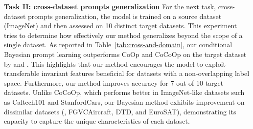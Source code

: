 \documentclass[10pt,twocolumn,letterpaper]{article}
\newcommand{\coop}{CoOp } \newcommand{\coopvpt}{CoOp+VPT } \newcommand{\cocoop}{CoCoOp } \newcommand{\cocoopvpt}{CoCoOp+VPT }
\begin{document}
\textbf{Task II: cross-dataset prompts generalization}
For the next task, cross-dataset prompts generalization, the model is trained on a source dataset (ImageNet) and then assessed on 10 distinct target datasets. This experiment tries to determine how effectively our method generalizes beyond the scope of a single dataset. 
As reported in Table~\ref{tab:cross-and-domain}, our conditional Bayesian prompt learning outperforms \coop and \cocoop on the target dataset  by  and . This highlights that our method encourages the model to exploit transferable invariant features beneficial for datasets with a non-overlapping label space. Furthermore, our method improves accuracy for 7 out of 10 target datasets. Unlike CoCoOp, which performs better in ImageNet-like datasets such as Caltech101 and StanfordCars, our Bayesian method exhibits improvement on dissimilar datasets (\eg, FGVCAircraft, DTD, and EuroSAT), demonstrating its capacity to capture the unique characteristics of each dataset.
\end{document}
